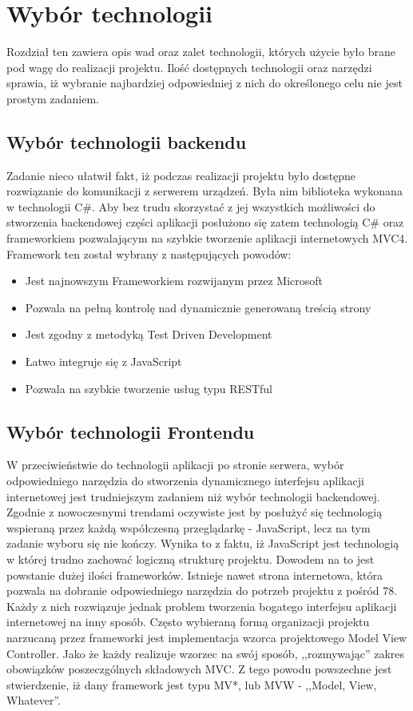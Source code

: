 \chapter{Wybór technologii}

Rozdział ten zawiera opis wad oraz zalet technologii, których użycie było brane pod wagę do realizacji projektu. Ilość dostępnych technologii oraz narzędzi sprawia, iż wybranie najbardziej odpowiedniej z nich do określonego celu nie jest prostym zadaniem.

\section{Wybór technologii backendu}

Zadanie nieco ułatwił fakt, iż podczas realizacji projektu było dostępne rozwiązanie do komunikacji z serwerem urządzeń. Była nim biblioteka wykonana w technologii C\#. Aby bez trudu skorzystać z jej wszystkich możliwości do stworzenia backendowej części aplikacji posłużono się zatem technologią C\# oraz frameworkiem pozwalającym na szybkie tworzenie aplikacji internetowych MVC4. Framework ten został wybrany z następujących powodów\cite{mvc-book}:

\begin{itemize}
\item Jest najnowszym Frameworkiem rozwijanym przez Microsoft
\item Pozwala na pełną kontrolę nad dynamicznie generowaną treścią strony
\item Jest zgodny z metodyką Test Driven Development
\item Łatwo integruje się z JavaScript
\item Pozwala na szybkie tworzenie usług typu RESTful
\end{itemize}


\section{Wybór technologii Frontendu}

W przeciwieństwie do technologii aplikacji po stronie serwera, wybór odpowiedniego narzędzia do stworzenia dynamicznego interfejsu aplikacji internetowej jest trudniejszym zadaniem niż wybór technologii backendowej. Zgodnie z nowoczesnymi trendami oczywiste jest by posłużyć się technologią wspieraną przez każdą współczesną przeglądarkę - JavaScript\cite{javascript-book}, lecz na tym zadanie wyboru się nie kończy. Wynika to z faktu, iż JavaScript jest technologią w której trudno zachować logiczną strukturę projektu. Dowodem na to jest powstanie dużej ilości frameworków. Istnieje nawet strona internetowa, która pozwala na dobranie odpowiedniego narzędzia do potrzeb projektu z pośród 78\cite{todomvc}. Każdy z nich rozwiązuje jednak problem tworzenia bogatego interfejsu aplikacji internetowej na inny sposób. Często wybieraną formą organizacji projektu narzucaną przez frameworki jest implementacja wzorca projektowego Model View Controller. Jako że każdy realizuje wzorzec na swój sposób, ,,rozmywając'' zakres obowiązków poszeczgólnych składowych MVC. Z tego powodu powszechne jest stwierdzenie, iż dany framework jest typu MV*, lub MVW - ,,Model, View, Whatever''. 

